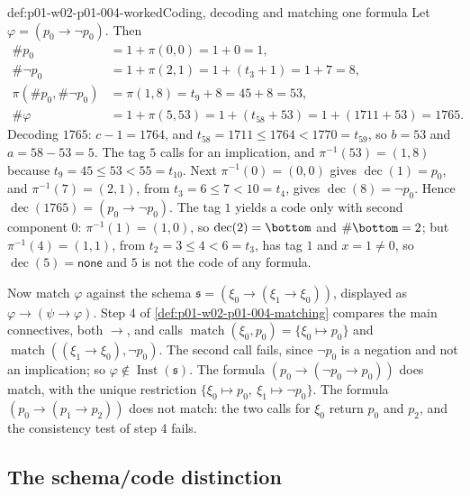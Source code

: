 \begin{hbexample}{def:p01-w02-p01-004-worked}{Coding, decoding and matching one formula}
Let \(\varphi=(p_0\to\neg p_0)\). Then
\[
\begin{aligned}
 \#p_0&=1+\pi(0,0)=1+0=1,\\
 \#\neg p_0&=1+\pi(2,1)=1+(t_3+1)=1+7=8,\\
 \pi(\#p_0,\#\neg p_0)&=\pi(1,8)=t_9+8=45+8=53,\\
 \#\varphi&=1+\pi(5,53)=1+(t_{58}+53)=1+(1711+53)=1765.
\end{aligned}
\]
Decoding \(1765\): \(c-1=1764\), and \(t_{58}=1711\le1764<1770=t_{59}\), so
\(b=53\) and \(a=58-53=5\). The tag \(5\) calls for an implication, and
\(\pi^{-1}(53)=(1,8)\) because \(t_9=45\le53<55=t_{10}\). Next
\(\pi^{-1}(0)=(0,0)\) gives \(\operatorname{dec}(1)=p_0\), and
\(\pi^{-1}(7)=(2,1)\), from \(t_3=6\le7<10=t_4\), gives
\(\operatorname{dec}(8)=\neg p_0\). Hence
\(\operatorname{dec}(1765)=(p_0\to\neg p_0)\). The tag \(1\) yields a code
only with second component \(0\): \(\pi^{-1}(1)=(1,0)\), so
\(\operatorname{dec}(2)=\bottom\) and \(\#\bottom=2\); but
\(\pi^{-1}(4)=(1,1)\), from \(t_2=3\le4<6=t_3\), has tag \(1\) and
\(x=1\ne0\), so \(\operatorname{dec}(5)=\mathsf{none}\) and \(5\) is not the
code of any formula.

Now match \(\varphi\) against the schema \(\mathfrak s=(\xi_0\to(\xi_1\to
\xi_0))\), displayed as \(\varphi\to(\psi\to\varphi)\). Step 4 of
\cref{def:p01-w02-p01-004-matching} compares the main connectives, both
\(\to\), and calls \(\operatorname{match}(\xi_0,p_0)=\{\xi_0\mapsto p_0\}\)
and \(\operatorname{match}((\xi_1\to\xi_0),\neg p_0)\). The second call
fails, since \(\neg p_0\) is a negation and not an implication; so
\(\varphi\notin\operatorname{Inst}(\mathfrak s)\). The formula
\((p_0\to(\neg p_0\to p_0))\) does match, with the unique restriction
\(\{\xi_0\mapsto p_0,\ \xi_1\mapsto\neg p_0\}\). The formula
\((p_0\to(p_1\to p_2))\) does not match: the two calls for \(\xi_0\) return
\(p_0\) and \(p_2\), and the consistency test of step 4 fails.
\end{hbexample}

\subsection{The schema/code distinction}
\label{sec:p01-w02-p01-004-distinction}

